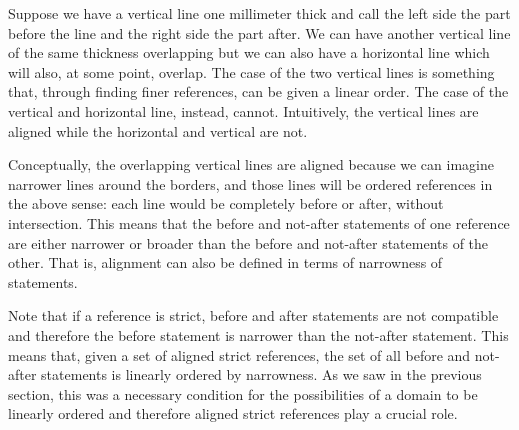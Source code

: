 Suppose we have a vertical line one millimeter thick and call the left side the part before the line and the right side the part after. We can have another vertical line of the same thickness overlapping but we can also have a horizontal line which will also, at some point, overlap. The case of the two vertical lines is something that, through finding finer references, can be given a linear order. The case of the vertical and horizontal line, instead, cannot. Intuitively, the vertical lines are aligned while the horizontal and vertical are not.

Conceptually, the overlapping vertical lines are aligned because we can imagine narrower lines around the borders, and those lines will be ordered references in the above sense: each line would be completely before or after, without intersection. This means that the before and not-after statements of one reference are either narrower or broader than the before and not-after statements of the other. That is, alignment can also be defined in terms of narrowness of statements.

Note that if a reference is strict, before and after statements are not compatible and therefore the before statement is narrower than the not-after statement. This means that, given a set of aligned strict references, the set of all before and not-after statements is linearly ordered by narrowness. As we saw in the previous section, this was a necessary condition for the possibilities of a domain to be linearly ordered and therefore aligned strict references play a crucial role.

